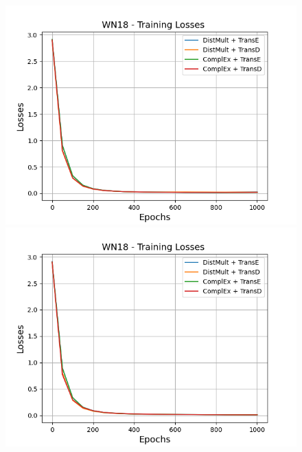 
\begin{figure}
    \centering
    \begin{minipage}{.5\textwidth}
      \centering
      \includegraphics[width=0.9\linewidth]{figures/results/gan_train/not_pretrained/random/wn18/random_wn18_losses.png}
    \end{minipage}%
    \begin{minipage}{.5\textwidth}
      \centering
      \includegraphics[width=0.9\linewidth]{figures/results/gan_train/not_pretrained/uncertainty/max_distribution/entropy/wn18/uncertainty_wn18_losses.png}
    \end{minipage}
    \begin{minipage}{.5\textwidth}
      \centering

\end{minipage}
\end{figure}
